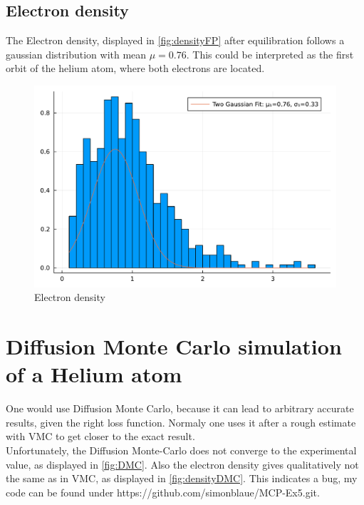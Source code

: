 \documentclass[
	a4paper, %
	10pt, %
]{CSUniSchoolLabReport}
\begin{document}
\subsection{Electron density}

The Electron density, displayed in \autoref{fig:densityFP} after equilibration follows a gaussian distribution with mean $\mu=0.76$. This could be interpreted as the first orbit of the helium atom, where both electrons are located.

\begin{figure}[H]
	\centering
	\includegraphics[width=\textwidth]{../saves/task1h.density.pdf}
	\caption{Electron density}
	\label{fig:densityFP}
\end{figure}

\section{Diffusion Monte Carlo simulation of a Helium atom}

One would use Diffusion Monte Carlo, because it can lead to arbitrary accurate results, given the right loss function. Normaly one uses it after a rough estimate with VMC to get closer to the exact result. \\
Unfortunately, the Diffusion Monte-Carlo does not converge to the experimental value, as displayed in \autoref{fig:DMC}. Also the electron density gives qualitatively not the same as in VMC, as displayed in \autoref{fig:densityDMC}. This indicates a bug, my code can be found under https://github.com/simonblaue/MCP-Ex5.git. 
\end{document}
